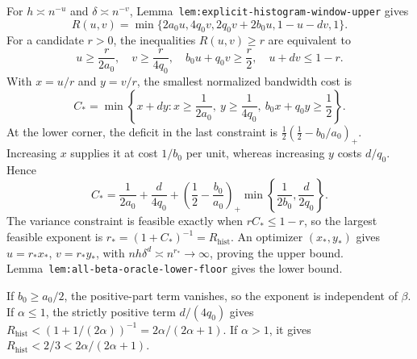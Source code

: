 For \(h\asymp n^{-u}\) and \(\delta\asymp n^{-v}\), Lemma~\texttt{lem:explicit-histogram-window-upper} gives
\[
R(u,v)=\min\{2a_0u,4q_0v,2q_0v+2b_0u,1-u-dv,1\}.
\]
For a candidate \(r>0\), the inequalities \(R(u,v)\ge r\) are equivalent to
\[
u\ge\frac r{2a_0},
\quad v\ge\frac r{4q_0},
\quad b_0u+q_0v\ge\frac r2,
\quad u+dv\le1-r.
\]
With \(x=u/r\) and \(y=v/r\), the smallest normalized bandwidth cost is
\[
C_*=
\min\left\{x+dy:x\ge\frac1{2a_0},\ y\ge\frac1{4q_0},\ b_0x+q_0y\ge\frac12\right\}.
\]
At the lower corner, the deficit in the last constraint is \(\tfrac12(\tfrac12-b_0/a_0)_+\). Increasing \(x\) supplies it at cost \(1/b_0\) per unit, whereas increasing \(y\) costs \(d/q_0\). Hence
\[
C_*=
\frac1{2a_0}+\frac d{4q_0}
+\left(\frac12-\frac{b_0}{a_0}\right)_+
\min\left\{\frac1{2b_0},\frac d{2q_0}\right\}.
\]
The variance constraint is feasible exactly when \(rC_*\le1-r\), so the largest feasible exponent is \(r_*=(1+C_*)^{-1}=R_{\mathrm{hist}}\). An optimizer \((x_*,y_*)\) gives \(u=r_*x_*\), \(v=r_*y_*\), with \(nh\delta^d\asymp n^{r_*}\to\infty\), proving the upper bound. Lemma~\texttt{lem:all-beta-oracle-lower-floor} gives the lower bound.

If \(b_0\ge a_0/2\), the positive-part term vanishes, so the exponent is independent of \(\beta\). If \(\alpha\le1\), the strictly positive term \(d/(4q_0)\) gives \(R_{\mathrm{hist}}<(1+1/(2\alpha))^{-1}=2\alpha/(2\alpha+1)\). If \(\alpha>1\), it gives \(R_{\mathrm{hist}}<2/3<2\alpha/(2\alpha+1)\).